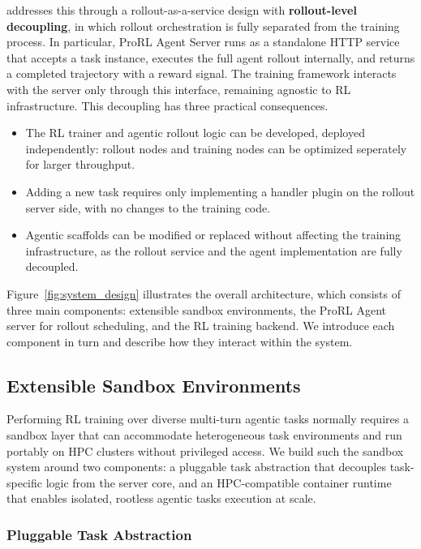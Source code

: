 \prorlagent addresses this through a rollout-as-a-service design with \textbf{rollout-level decoupling}, in which rollout orchestration is fully separated from the training process.
In particular, ProRL Agent Server runs as a standalone HTTP service that accepts a task instance, executes the full agent rollout internally, and returns a completed trajectory with a reward signal. The training framework interacts with the server only through this interface, remaining agnostic to RL infrastructure. This decoupling has three practical consequences.
\begin{itemize}
    \item The RL trainer and agentic rollout logic can be developed, deployed independently: rollout nodes and training nodes can be optimized seperately for larger throughput.
    \item Adding a new task requires only implementing a handler plugin on the rollout server side, with no changes to the training code.
    \item Agentic scaffolds can be modified or replaced without affecting the training infrastructure, as the rollout service and the agent implementation are fully decoupled. 
\end{itemize}
Figure~\ref{fig:system_design} illustrates the overall architecture, which consists of three main components: extensible sandbox environments, the ProRL Agent server for rollout scheduling, and the RL training backend. We introduce each component in turn and describe how they interact within the system.

\subsection{Extensible Sandbox Environments} 
\label{sec:sandbox}

Performing RL training over diverse multi-turn agentic tasks normally requires a sandbox layer that can accommodate heterogeneous task environments and run portably on HPC clusters without privileged access.
We build such the sandbox system around two components: a pluggable task abstraction that decouples task-specific logic from the server core, and an HPC-compatible container runtime that enables isolated, rootless agentic tasks execution at scale.

\subsubsection{Pluggable Task Abstraction}
\label{sec:handlers}

